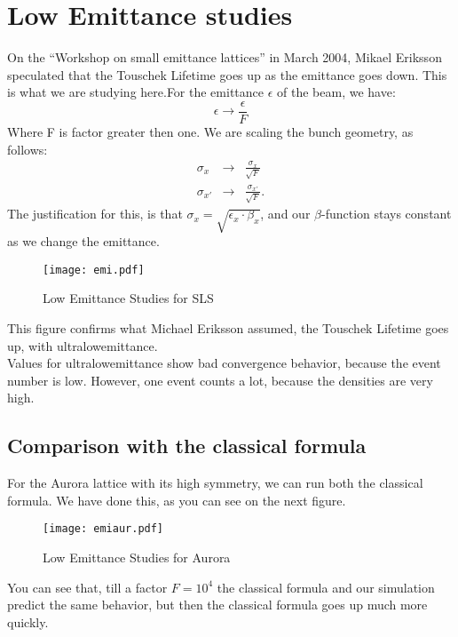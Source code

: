 \section{Low Emittance studies}
On the ``Workshop on small emittance lattices'' in March 2004,  Mikael Eriksson speculated that the Touschek Lifetime goes up as the emittance goes down. This is what we are studying here.For the emittance $\epsilon$ of the beam, we have:
\begin{equation} \epsilon \rightarrow \frac \epsilon F \end{equation}
Where F is factor greater then one. We are scaling the bunch geometry, as follows:
\begin{eqnarray}
\sigma_x &\rightarrow& \frac{\sigma_x}{\sqrt F} \\
\sigma_{x'} &\rightarrow& \frac{\sigma_{x'}}{\sqrt F} .
\end{eqnarray}
The justification for this, is that $\sigma_x = \sqrt{\epsilon_x \cdot \beta_x}$, and our $\beta$-function stays constant as we change the emittance.
\begin{figure}[here]
 \centering
   \texttt{[image: emi.pdf]}
 \caption{Low Emittance Studies for SLS} 
\end{figure}
This figure confirms what Michael Eriksson assumed, the Touschek Lifetime goes up, with ultralowemittance.\\
Values for ultralowemittance show bad convergence behavior, because the event number is low. However, one event counts a lot, because the densities are very high.
\subsection{Comparison with the classical formula}
For the Aurora lattice with its high symmetry, we can run both the classical formula. We have done this, as you can see on the next figure.
\begin{figure}[here]
 \centering
   \texttt{[image: emiaur.pdf]}
 \caption{Low Emittance Studies for Aurora}
\end{figure}
You can see that, till a factor $F = 10^4$ the classical formula and our simulation predict the same behavior, but then the classical formula goes up much more quickly.

